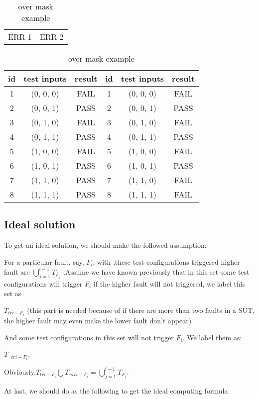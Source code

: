 \documentclass{sig-alternate}
\begin{document}
\begin{table}
\centering
\caption{over mask example}
\label{another_idea_masking}
\begin{tabular}{p{}|p{}} \hline
   ERR 1 & ERR 2
\end{tabular}

\begin{tabular}{c|c|c|c|c|c} \hline
id &test inputs & result & id&test inputs & result\\ \hline
1 &(0, 0, 0) &  FAIL &1&(0, 0, 0) &  FAIL\\ \hline
2 &(0, 0, 1) &  PASS &2&(0, 0, 1) &  PASS\\ \hline
3 &(0, 1, 0) &  FAIL &3&(0, 1, 0) &  FAIL\\ \hline
4 &(0, 1, 1) &  PASS &4&(0, 1, 1) &  PASS\\ \hline
5 &(1, 0, 0) &  FAIL &5&(1, 0, 0) &  FAIL\\ \hline
6 &(1, 0, 1) &  PASS &6&(1, 0, 1) &  PASS\\ \hline
7 &(1, 1, 0) &  PASS &7&(1, 1, 0) &  FAIL\\ \hline
8 &(1, 1, 1) &  PASS &8&(1, 1, 1) &  FAIL\\ \hline
\hline\end{tabular}
\end{table}

\subsection{Ideal solution}
To get an ideal solution, we should make the followed assumption:

For a particular fault, say, $F_{i}$, with ,these test configurations triggered higher fault are  $ \bigcup_{j = 1}^{i-1}T_{F_{j}}$ .Assume we have known previously that in this set some test configurations will trigger $F_{i}$ if the higher fault will not triggered, we label this set as

$ T_{tri-F_{i}}$ (this part is needed because of if there are more than two faults in a SUT, the higher fault may even make the lower fault don't appear)

And some test configurations in this set will not trigger $F_{i}$. We label them as:

$ T_{\neg tri-F_{i}}$.

Obviously,$ T_{tri-F_{i}}\bigcup T_{\neg tri-F_{i}} = \bigcup_{j = 1}^{i-1}T_{F_{j}}$.


At last, we should do as the following to get the ideal computing formula:
\end{document}
